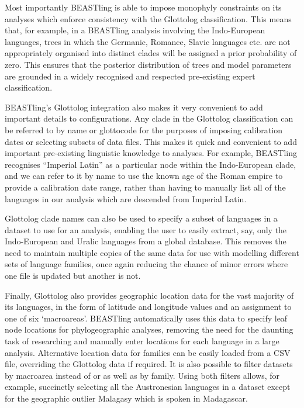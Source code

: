 \documentclass[10pt,a4paper]{article}
\begin{document}
Most importantly BEASTling is able to impose monophyly constraints on its analyses which enforce consistency with the Glottolog classification.  This means that, for example, in a BEASTling analysis involving the Indo-European languages, trees in which the Germanic, Romance, Slavic languages etc. are not appropriately organised into distinct clades will be assigned a prior probability of zero.  This ensures that the posterior distribution of trees and model parameters are grounded in a widely recognised and respected pre-existing expert classification.

BEASTling's Glottolog integration also makes it very convenient to add important details to configurations.  Any clade in the Glottolog classification can be referred to by name or glottocode for the purposes of imposing calibration dates or selecting subsets of data files.  This makes it quick and convenient to add important pre-existing linguistic knowledge to analyses.  For example, BEASTling recognises ``Imperial Latin'' as a particular node within the Indo-European clade, and we can refer to it by name to use the known age of the Roman empire to provide a calibration date range, rather than having to manually list all of the languages in our analysis which are descended from Imperial Latin.

Glottolog clade names can also be used to specify a subset of languages in a dataset to use for an analysis, enabling the user to easily extract, say, only the Indo-European and Uralic languages from a global database.  This removes the need to maintain multiple copies of the same data for use with modelling different sets of language families, once again reducing the chance of minor errors where one file is updated but another is not.

Finally, Glottolog also provides geographic location data for the vast majority of its languages, in the form of latitude and longitude values and an assignment to one of six `macroareas'\cite{Hammarstroem2014}.  BEASTling automatically uses this data to specify leaf node locations for phylogeographic analyses, removing the need for the daunting task of researching and manually enter locations for each language in a large analysis.  Alternative location data for families can be easily loaded from a CSV file, overriding the Glottolog data if required.  It is also possible to filter datasets by macroarea instead of or as well as by family.  Using both filters allows, for example, succinctly selecting all the Austronesian languages in a dataset except for the geographic outlier Malagasy which is spoken in Madagascar.
\end{document}
